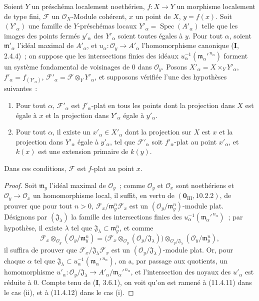 \begin{theorem}[11.5.1]
\label{IV.11.5.1-fr}
Soient $Y$ un préschéma localement noethérien, $f:X\to Y$ un morphisme
localement de type fini, $\mathcal F$ un $\mathcal O_X$-Module cohérent, $x$ un
point de $X$, $y=f(x)$. Soit $(Y'_\alpha)$ une famille de $Y$-préschémas locaux
$Y'_\alpha=\operatorname{Spec}(A'_\alpha)$ telle que les images des points
fermés $y'_\alpha$ des $Y'_\alpha$ soient toutes égales à $y$. Pour tout
$\alpha$, soient $\mathfrak m'_\alpha$ l'idéal maximal de $A'_\alpha$, et
$u_\alpha:\mathcal O_y\to A'_\alpha$
l'homomorphisme canonique
(\textbf I, 2.4.4)~; on suppose que les intersections finies des idéaux
$u_\alpha^{-1}(\mathfrak m_\alpha'^{\,n_\alpha})$ forment un système fondamental
de voisinages de $0$ dans $\mathcal O_y$. Posons
$X'_\alpha=X\times_Y Y'_\alpha$, $f'_\alpha=f_{(Y'_\alpha)}$,
$\mathcal F'_\alpha=\mathcal F\otimes_Y Y'_\alpha$, et supposons vérifiée l'une
des hypothèses suivantes~:
\begin{enumerate}[label=(\roman*)]
  \item Pour tout $\alpha$, $\mathcal F'_\alpha$ est $f'_\alpha$-plat en tous
  les points dont la projection dans $X$ est égale à $x$ et la projection dans
  $Y'_\alpha$ égale à $y'_\alpha$.
  \item Pour tout $\alpha$, il existe un $x'_\alpha\in X'_\alpha$ dont la
  projection sur $X$ est $x$ et la projection dans $Y'_\alpha$ égale à
  $y'_\alpha$, tel que $\mathcal F'_\alpha$ soit $f'_\alpha$-plat au point
  $x'_\alpha$, et $k(x)$ est une extension primaire de $k(y)$.
\end{enumerate}
Dans ces conditions, $\mathcal F$ est $f$-plat au point $x$.
\end{theorem}

\begin{proof}
Soit $\mathfrak m_y$ l'idéal maximal de $\mathcal O_y$~; comme $\mathcal O_y$
et $\mathcal O_x$ sont noethériens et $\mathcal O_y\to\mathcal O_x$ un
homomorphisme local, il suffit, en vertu de
$(\mathbf 0_{\mathrm{III}},10.2.2)$, de prouver que pour tout $n>0$,
$\mathcal F_x/\mathfrak m_y^n\mathcal F_x$ est un
$(\mathcal O_y/\mathfrak m_y^n)$-module plat. Désignons par
$(\mathfrak J_\lambda)$ la famille des intersections finies des
$u_\alpha^{-1}(\mathfrak m_\alpha'^{\,n_\alpha})$~; par hypothèse, il existe
$\lambda$ tel que $\mathfrak J_\lambda\subset\mathfrak m_y^n$, et comme
\[
\mathcal F_x\otimes_{\mathcal O_y}(\mathcal O_y/\mathfrak m_y^n)
=\bigl(\mathcal F_x\otimes_{\mathcal O_y}(\mathcal O_y/\mathfrak J_\lambda)\bigr)
 \otimes_{\mathcal O_y/\mathfrak J_\lambda}(\mathcal O_y/\mathfrak m_y^n),
\]
il suffira de prouver que $\mathcal F_x/\mathfrak J_\lambda\mathcal F_x$ est un
$(\mathcal O_y/\mathfrak J_\lambda)$-module plat. Or, pour chaque $\alpha$ tel
que $\mathfrak J_\lambda\subset u_\alpha^{-1}(\mathfrak m_\alpha'^{\,n_\alpha})$,
on a, par passage aux quotients, un homomorphisme
$u'_\alpha:\mathcal O_y/\mathfrak J_\lambda\to
A'_\alpha/\mathfrak m_\alpha'^{\,n_\alpha}$, et l'intersection des noyaux des
$u'_\alpha$ est réduite à $0$. Compte tenu de (\textbf I, 3.6.1), on voit qu'on
est ramené à (11.4.11) dans le cas (ii), et à (11.4.12) dans le cas (i).
\end{proof}

